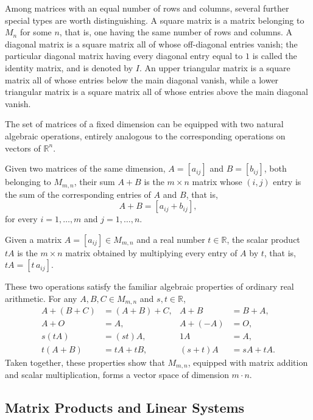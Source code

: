 Among matrices with an equal number of rows and columns, several further special types are worth distinguishing. A square matrix is a matrix belonging to $M_n$ for some $n$, that is, one having the same number of rows and columns. A diagonal matrix is a square matrix all of whose off-diagonal entries vanish; the particular diagonal matrix having every diagonal entry equal to $1$ is called the identity matrix, and is denoted by $I$. An upper triangular matrix is a square matrix all of whose entries below the main diagonal vanish, while a lower triangular matrix is a square matrix all of whose entries above the main diagonal vanish.


The set of matrices of a fixed dimension can be equipped with two natural algebraic operations, entirely analogous to the corresponding operations on vectors of $\mathbb{R}^n$.

\begin{definition}
Given two matrices of the same dimension, $A = [a_{ij}]$ and $B = [b_{ij}]$, both belonging to $M_{m,n}$, their sum $A+B$ is the $m \times n$ matrix whose $(i,j)$ entry is the sum of the corresponding entries of $A$ and $B$, that is,
\[
A + B = [a_{ij} + b_{ij}],
\] for every $i = 1, \dots, m$ and $j = 1, \dots, n$.
\end{definition}

\begin{definition}
Given a matrix $A = [a_{ij}] \in M_{m,n}$ and a real number $t \in \mathbb{R}$, the scalar product $tA$ is the $m \times n$ matrix obtained by multiplying every entry of $A$ by $t$, that is, $tA = [t \, a_{ij}]$.
\end{definition}

These two operations satisfy the familiar algebraic properties of ordinary real arithmetic. For any $A,B,C\in M_{m,n}$ and $s,t\in\mathbb{R}$,
\[
\begin{aligned}
A+(B+C)&=(A+B)+C, & A+B&=B+A,\\
A+O&=A, & A+(-A)&=O,\\
s(tA)&=(st)A, & 1A&=A,\\
t(A+B)&=tA+tB, & (s+t)A&=sA+tA.
\end{aligned}
\]
Taken together, these properties show that $M_{m,n}$, equipped with matrix addition and scalar multiplication, forms a vector space of dimension $m\cdot n$.

\subsection{Matrix Products and Linear Systems}

